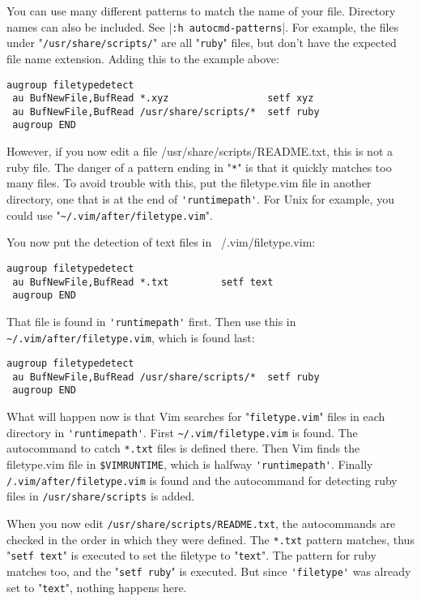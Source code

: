 You can use many different patterns to match the name of your file.
Directory names can also be included.
See |\verb!:h autocmd-patterns!|.
For example, the files under "\verb!/usr/share/scripts/!" are all "\verb!ruby!" files, but don't have the expected file name extension.
Adding this to the example above:

\begin{Verbatim}[samepage=true]
 augroup filetypedetect
 au BufNewFile,BufRead *.xyz                 setf xyz
 au BufNewFile,BufRead /usr/share/scripts/*  setf ruby
 augroup END
\end{Verbatim}

However, if you now edit a file /usr/share/scripts/README.txt, this is not a
ruby file.  The danger of a pattern ending in "\verb!*!" is that it quickly matches
too many files.  To avoid trouble with this, put the filetype.vim file in
another directory, one that is at the end of \verb!'runtimepath'!.  For Unix for
example, you could use "\verb!~/.vim/after/filetype.vim!".

You now put the detection of text files in ~/.vim/filetype.vim:

\begin{Verbatim}[samepage=true]
 augroup filetypedetect
 au BufNewFile,BufRead *.txt         setf text
 augroup END
\end{Verbatim}

That file is found in \verb!'runtimepath'! first.
Then use this in \verb!~/.vim/after/filetype.vim!, which is found last:

\begin{Verbatim}[samepage=true]
 augroup filetypedetect
 au BufNewFile,BufRead /usr/share/scripts/*  setf ruby
 augroup END
\end{Verbatim}

What will happen now is that Vim searches for "\verb!filetype.vim!" files in each directory in \verb!'runtimepath'!.
First \verb!~/.vim/filetype.vim! is found.
The autocommand to catch \verb!*.txt! files is defined there.
Then Vim finds the filetype.vim file in \verb!$VIMRUNTIME!, which is halfway \verb!'runtimepath'!.
Finally \verb!/.vim/after/filetype.vim! is found and the autocommand for detecting ruby files in \verb!/usr/share/scripts! is added.

When you now edit \verb!/usr/share/scripts/README.txt!, the autocommands are checked in the order in which they were defined.
The \verb!*.txt! pattern matches, thus "\verb!setf text!" is executed to set the filetype to "\verb!text!".
The pattern for ruby matches too, and the "\verb!setf ruby!" is executed.
But since \verb!'filetype'! was already set to "\verb!text!", nothing happens here.

